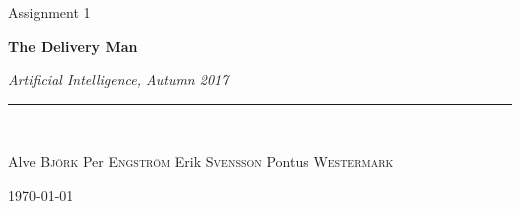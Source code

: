 \vspace*{5cm}

{\huge \textsf{Assignment 1}}

\begin{flushleft}
  
\Huge \textsf{\textbf{The Delivery Man}}
\end{flushleft}

\emph{Artificial Intelligence, Autumn 2017} \\
\rule{\textwidth}{1pt} \\
\begin{flushright}
  Alve \textsc{Björk} \quad Per \textsc{Engström} \quad Erik \textsc{Svensson}
  \quad Pontus \textsc{Westermark}
  
  \today
\end{flushright}

\thispagestyle{empty}
